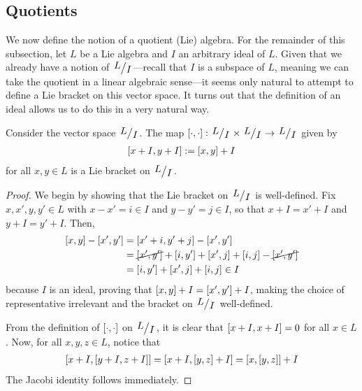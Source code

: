 \subsection{Quotients}

We now define the notion of a quotient (Lie) algebra. For the remainder of this subsection, let $L$ be a Lie algebra and $I$ an arbitrary ideal of $L$. Given that we already have a notion of $\quotient{L}{I}$---recall that $I$ is a subspace of $L$, meaning we can take the quotient in a linear algebraic sense---it seems only natural to attempt to define a Lie bracket on this vector space. It turns out that the definition of an ideal allows us to do this in a very natural way.

\begin{boxproposition}\label{Ch1:Prop:QuotientAlgebraLieBracket}
    Consider the vector space $\quotient{L}{I}$. The map $\liebrac : \quotient{L}{I} \times \quotient{L}{I} \to \quotient{L}{I}$ given by
    \begin{align}
        \left[ x + I, y + I \right] := \left[ x, y \right] + I
        \label{Ch1:Eq:QuotientBracket}
    \end{align}
    for all $x, y \in L$ is a Lie bracket on $\quotient{L}{I}$.
\end{boxproposition}
\begin{proof}
    We begin by showing that the Lie bracket on $\quotient{L}{I}$ is well-defined. Fix $x, x', y, y' \in L$ with $x - x' = i \in I$ and $y - y' = j \in I$, so that $x + I = x' + I$ and $y + I = y' + I$. Then,
    \begin{align*}
        \left[ x, y \right] - \left[ x', y' \right]
        &= \left[ x' + i, y' + j \right] - \left[ x', y' \right] \\
        &= \cancel{\left[ x', y' \right]} + \left[ i, y' \right] + \left[ x', j \right] + \left[ i, j \right] - \cancel{\left[ x', y' \right]} \\
        &= \left[ i, y' \right] + \left[ x', j \right] + \left[ i, j \right] \in I
    \end{align*}
    because $I$ is an ideal, proving that $\left[ x, y \right] + I = \left[ x', y' \right] + I$, making the choice of representative irrelevant and the bracket on $\quotient{L}{I}$ well-defined.

    From the definition of $\left[ \cdot, \cdot \right]$ on $\quotient{L}{I}$, it is clear that $\left[ x + I, x + I \right] = 0$ for all $x \in L$. Now, for all $x, y, z \in L$, notice that
    \begin{align*}
        \left[ x + I, \left[ y + I, z + I \right] \right] = \left[ x + I, \left[ y, z \right] + I \right] = \left[ x, \left[ y, z \right] \right] + I
    \end{align*}
    The Jacobi identity follows immediately.
\end{proof}

